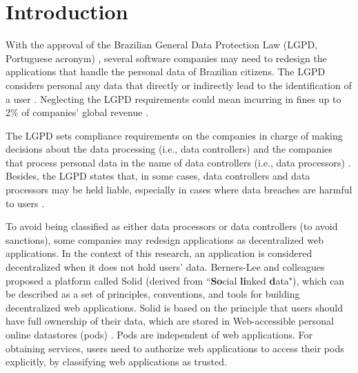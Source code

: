\documentclass[sigconf]{acmart}
\begin{document}
%

%
\maketitle

\section{Introduction}

With the approval of the Brazilian General Data Protection Law (LGPD, Portuguese acronym) \cite{LGPD18}, several software companies may need to redesign the applications that handle the personal data of Brazilian citizens. The LGPD considers personal any data that directly or indirectly lead to the identification of a user \cite{LGPD18}. Neglecting the LGPD requirements could mean incurring in fines up to 2\% of companies' global revenue \cite{LGPD18}.

The LGPD sets compliance requirements on the companies in charge of making decisions about the data processing (i.e., data controllers) and the companies that process personal data in the name of data controllers (i.e., data processors) \cite{LGPD18}. Besides, the LGPD states that, in some cases, data controllers and data processors may be held liable, especially in cases where data breaches are harmful to users \cite{LGPD18}.

To avoid being classified as either data processors or data controllers (to avoid sanctions), some companies may redesign applications as decentralized web applications. In the context of this research, an application is considered decentralized when it does not hold users' data. Berners-Lee and colleagues \cite{Sambra} proposed a platform called Solid (derived from ``\textbf{So}cial \textbf{li}nked \textbf{d}ata"), which can be described as a set of principles, conventions, and tools for building decentralized web applications. Solid is based on the principle that users should have full ownership of their data, which are stored in Web-accessible personal online datastores (pods) \cite{Sambra}. Pods are independent of web applications. For obtaining services, users need to authorize web applications to access their pods explicitly, by classifying web applications as trusted.
\end{document}
